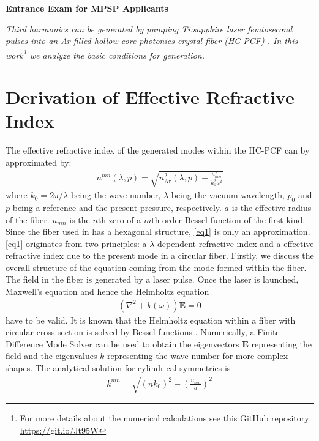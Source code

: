 \documentclass[fleqn, 10pt, twocolumn]{SelfArx}
\begin{document}
%
\begin{center}
\colorbox{color2!10}{\large{}\textcolor{color1}{\sffamily\bfseries Entrance Exam for MPSP Applicants}}
\end{center}
    \textit{Third harmonics can be generated by pumping Ti:sapphire laser femtosecond pulses into an Ar-filled hollow core photonics crystal fiber (HC-PCF) \cite{Nold2010}. In this
    work\footnote{For more details about the numerical calculations see this GitHub repository \url{https://git.io/Jt95W}} we analyze the basic conditions for generation.}

    \section{Derivation of Effective Refractive Index}
    The effective refractive index of the generated modes within the HC-PCF can by approximated by:
    \begin{align}
        n^{mn}(\lambda, p) = \sqrt{n^2_{\text{Ar}}(\lambda, p ) - \frac{u_{mn}^2}{k_0^2 a^2}} 
        \label{eq1}
    \end{align}
    where $k_0=2\pi/\lambda$ being the wave number, $\lambda$ being the vacuum wavelength, $p_0$ and $p$ being a reference and the present pressure, respectively. $a$ is the 
    effective radius of the fiber. $u_{mn}$ is the $n$th zero of a $m$th order Bessel function of the first kind. Since the fiber used in \cite{Nold2010} has a hexagonal structure, \eqref{eq1} is only an approximation.
    \eqref{eq1} originates from two principles: a $\lambda$ dependent refractive index and a effective refractive index due to the present mode in a circular fiber.
    Firstly, we discuss the overall structure of the equation coming from the mode formed within the fiber. The field in the fiber is generated by a laser pulse. Once the laser is launched, Maxwell's equation and hence the Helmholtz equation 
    \begin{align}
        \left(\nabla^2 + k(\omega)\right) \mathbf E = 0
        \label{eq:helmholtz}
    \end{align}
    have to be valid.
    It is known that the Helmholtz equation within a fiber with circular cross section is solved by Bessel functions \cite{Nickelson2019}. 
    Numerically, a Finite Difference Mode Solver can be used to obtain the eigenvectors $\mathbf E$ representing the field and the eigenvalues $k$ representing the wave number for more complex shapes. The analytical solution for cylindrical symmetries is 
    \begin{align}
        k^{mn} = \sqrt{(n k_0)^2 - \left( \frac{u_{mn}}{a}\right)^2}
    \end{align}
\end{document}
